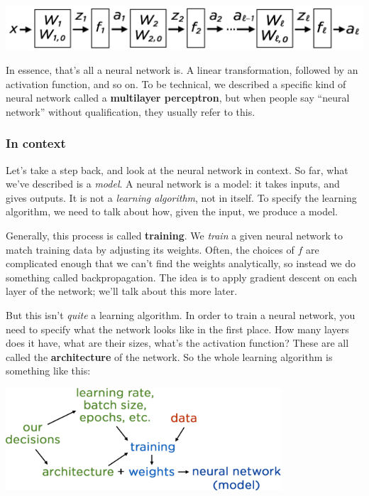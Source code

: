 \documentclass[11pt,paper=letter]{scrartcl}
\begin{document}
\begin{center}
  \includegraphics[width=\textwidth]{26.png}
\end{center}

In essence, that's all a neural network is. A linear transformation, followed by an activation function, and so on. To be technical, we described a specific kind of neural network called a \textbf{multilayer perceptron}, but when people say ``neural network'' without qualification, they usually refer to this.

\subsubsection*{In context}

Let's take a step back, and look at the neural network in context. So far, what we've described is a \textit{model}. A neural network is a model: it takes inputs, and gives outputs. It is not a \textit{learning algorithm}, not in itself. To specify the learning algorithm, we need to talk about how, given the input, we produce a model.

Generally, this process is called \textbf{training}. We \textit{train} a given neural network to match training data by adjusting its weights. Often, the choices of $f$ are complicated enough that we can't find the weights analytically, so instead we do something called backpropagation. The idea is to apply gradient descent on each layer of the network; we'll talk about this more later.

But this isn't \textit{quite} a learning algorithm. In order to train a neural network, you need to specify what the network looks like in the first place. How many layers does it have, what are their sizes, what's the activation function? These are all called the \textbf{architecture} of the network. So the whole learning algorithm is something like this:

\begin{center}
  \includegraphics[height=1.5in]{27.png}
\end{center}
\end{document}
